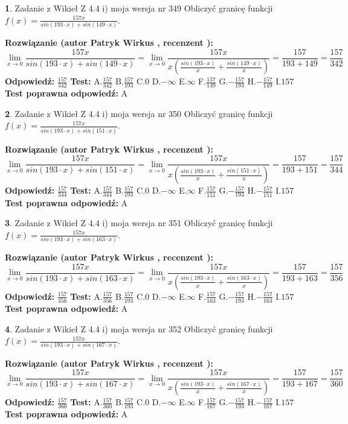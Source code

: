 \documentclass[12pt, a4paper]{article}
\theoremstyle{definition} %
\newtheorem{zad}{}
\newcommand{\zadStart}[1]{\begin{zad}#1\newline}
\newcommand{\zadStop}{\end{zad}}
\newcommand{\rozwStart}[2]{\noindent \textbf{Rozwiązanie (autor #1 , recenzent #2): }\newline}
\newcommand{\rozwStop}{\newline}
\newcommand{\odpStart}{\noindent \textbf{Odpowiedź:}\newline}
\newcommand{\odpStop}{\newline}
\newcommand{\testStart}{\noindent \textbf{Test:}\newline}
\newcommand{\testStop}{\newline}
\newcommand{\kluczStart}{\noindent \textbf{Test poprawna odpowiedź:}\newline}
\newcommand{\kluczStop}{\newline}
\begin{document}
\zadStart{Zadanie z Wikieł Z 4.4 i) moja wersja nr 349}
Obliczyć granicę funkcji $f(x)=\frac{157x}{sin(193\cdot x) +sin(149\cdot x)}$.
\zadStop
\rozwStart{Patryk Wirkus}{}
$$\lim\limits_{x\to 0}\frac{157x}{sin(193\cdot x) +sin(149\cdot x)}=\lim\limits_{x\to 0}\frac{157x}{x(\frac{sin(193\cdot x)}{x}+\frac{sin(149\cdot x)}{x})}=\frac{157}{193+149} = \frac{157}{342}$$
\rozwStop
\odpStart
$\frac{157}{342}$
\odpStop
\testStart
A.$\frac{157}{342}$
B.$\frac{157}{193}$
C.$0$
D.$-\infty$
E.$\infty$
F.$\frac{157}{149}$
G.$-\frac{157}{193}$
H.$-\frac{157}{149}$
I.$157$
\testStop
\kluczStart
A
\kluczStop



\zadStart{Zadanie z Wikieł Z 4.4 i) moja wersja nr 350}
Obliczyć granicę funkcji $f(x)=\frac{157x}{sin(193\cdot x) +sin(151\cdot x)}$.
\zadStop
\rozwStart{Patryk Wirkus}{}
$$\lim\limits_{x\to 0}\frac{157x}{sin(193\cdot x) +sin(151\cdot x)}=\lim\limits_{x\to 0}\frac{157x}{x(\frac{sin(193\cdot x)}{x}+\frac{sin(151\cdot x)}{x})}=\frac{157}{193+151} = \frac{157}{344}$$
\rozwStop
\odpStart
$\frac{157}{344}$
\odpStop
\testStart
A.$\frac{157}{344}$
B.$\frac{157}{193}$
C.$0$
D.$-\infty$
E.$\infty$
F.$\frac{157}{151}$
G.$-\frac{157}{193}$
H.$-\frac{157}{151}$
I.$157$
\testStop
\kluczStart
A
\kluczStop



\zadStart{Zadanie z Wikieł Z 4.4 i) moja wersja nr 351}
Obliczyć granicę funkcji $f(x)=\frac{157x}{sin(193\cdot x) +sin(163\cdot x)}$.
\zadStop
\rozwStart{Patryk Wirkus}{}
$$\lim\limits_{x\to 0}\frac{157x}{sin(193\cdot x) +sin(163\cdot x)}=\lim\limits_{x\to 0}\frac{157x}{x(\frac{sin(193\cdot x)}{x}+\frac{sin(163\cdot x)}{x})}=\frac{157}{193+163} = \frac{157}{356}$$
\rozwStop
\odpStart
$\frac{157}{356}$
\odpStop
\testStart
A.$\frac{157}{356}$
B.$\frac{157}{193}$
C.$0$
D.$-\infty$
E.$\infty$
F.$\frac{157}{163}$
G.$-\frac{157}{193}$
H.$-\frac{157}{163}$
I.$157$
\testStop
\kluczStart
A
\kluczStop



\zadStart{Zadanie z Wikieł Z 4.4 i) moja wersja nr 352}
Obliczyć granicę funkcji $f(x)=\frac{157x}{sin(193\cdot x) +sin(167\cdot x)}$.
\zadStop
\rozwStart{Patryk Wirkus}{}
$$\lim\limits_{x\to 0}\frac{157x}{sin(193\cdot x) +sin(167\cdot x)}=\lim\limits_{x\to 0}\frac{157x}{x(\frac{sin(193\cdot x)}{x}+\frac{sin(167\cdot x)}{x})}=\frac{157}{193+167} = \frac{157}{360}$$
\rozwStop
\odpStart
$\frac{157}{360}$
\odpStop
\testStart
A.$\frac{157}{360}$
B.$\frac{157}{193}$
C.$0$
D.$-\infty$
E.$\infty$
F.$\frac{157}{167}$
G.$-\frac{157}{193}$
H.$-\frac{157}{167}$
I.$157$
\testStop
\kluczStart
A
\kluczStop
\end{document}
